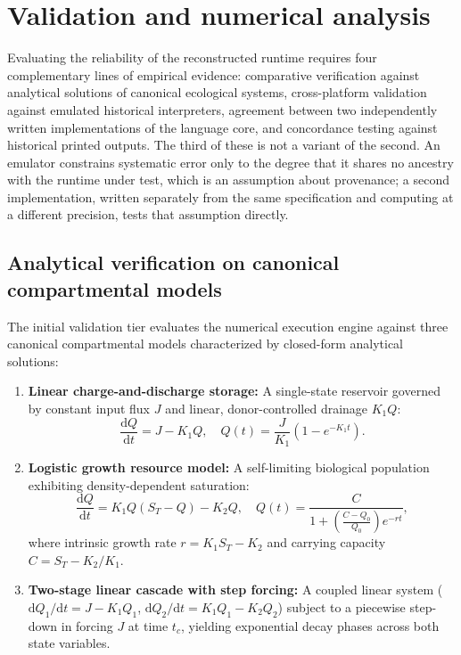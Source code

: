\documentclass[11pt,a4paper]{article}
\begin{document}
\section{Validation and numerical analysis}
\label{sec:validation}

Evaluating the reliability of the reconstructed runtime requires four complementary lines of empirical evidence: comparative verification against analytical solutions of canonical ecological systems, cross-platform validation against emulated historical interpreters, agreement between two independently written implementations of the language core, and concordance testing against historical printed outputs. The third of these is not a variant of the second. An emulator constrains systematic error only to the degree that it shares no ancestry with the runtime under test, which is an assumption about provenance; a second implementation, written separately from the same specification and computing at a different precision, tests that assumption directly.

\subsection{Analytical verification on canonical compartmental models}

The initial validation tier evaluates the numerical execution engine against three canonical compartmental models characterized by closed-form analytical solutions:
\begin{enumerate}
\item \textbf{Linear charge-and-discharge storage:} A single-state reservoir governed by constant input flux $J$ and linear, donor-controlled drainage $K_1Q$:
\begin{equation}
\frac{\mathrm{d}Q}{\mathrm{d}t} = J - K_1Q, \quad Q(t) = \frac{J}{K_1}\left(1 - e^{-K_1t}\right).
\end{equation}
\item \textbf{Logistic growth resource model:} A self-limiting biological population exhibiting density-dependent saturation:
\begin{equation}
\frac{\mathrm{d}Q}{\mathrm{d}t} = K_1Q(S_T - Q) - K_2Q, \quad Q(t) = \frac{C}{1 + \left(\frac{C - Q_0}{Q_0}\right)e^{-rt}},
\end{equation}
where intrinsic growth rate $r = K_1S_T - K_2$ and carrying capacity $C = S_T - K_2/K_1$.
\item \textbf{Two-stage linear cascade with step forcing:} A coupled linear system ($\mathrm{d}Q_1/\mathrm{d}t = J - K_1Q_1$, $\mathrm{d}Q_2/\mathrm{d}t = K_1Q_1 - K_2Q_2$) subject to a piecewise step-down in forcing $J$ at time $t_c$, yielding exponential decay phases across both state variables.
\end{enumerate}
\end{document}
